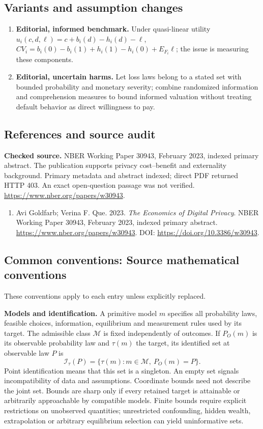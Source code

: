 \documentclass[11pt,a4paper]{article}
\begin{document}
\subsection*{Variants and assumption changes}
\begin{enumerate}
\item \textbf{Editorial, informed benchmark.} Under quasi-linear utility \(u_i(c,d,\ell)=c+b_i(d)-h_i(d)-\ell\), \(CV_i=b_i(0)-b_i(1)+h_i(1)-h_i(0)+E_{F_i}\ell\); the issue is measuring these components.
\item \textbf{Editorial, uncertain harms.} Let loss laws belong to a stated set with bounded probability and monetary severity; combine randomized information and comprehension measures to bound informed valuation without treating default behavior as direct willingness to pay.
\end{enumerate}
\subsection*{References and source audit}
\textbf{Checked source.} NBER Working Paper 30943, February 2023, indexed primary abstract. The publication supports privacy cost--benefit and externality background. Primary metadata and abstract indexed; direct PDF returned HTTP 403. An exact open-question passage was not verified. \url{https://www.nber.org/papers/w30943}.
\begin{enumerate}\raggedright
\item\hypertarget{definitions:source:30007688:1}{} Avi Goldfarb; Verina F. Que. 2023. \emph{The Economics of Digital Privacy}. NBER Working Paper 30943, February 2023, indexed primary abstract.
\url{https://www.nber.org/papers/w30943}.
DOI: \url{https://doi.org/10.3386/w30943}.
\end{enumerate}

\subsection*{Common conventions: Source mathematical conventions}

These conventions apply to each entry unless explicitly replaced.

\textbf{Models and identification.} A primitive model \(m\) specifies all probability laws, feasible choices, information, equilibrium and measurement rules used by its target. The admissible class \(\mathcal M\) is fixed independently of outcomes. If \(P_O(m)\) is its observable probability law and \(\tau(m)\) the target, its identified set at observable law \(P\) is
\[
 \mathcal I_\tau(P)=\{\tau(m):m\in\mathcal M,\ P_O(m)=P\}.
\]
Point identification means that this set is a singleton. An empty set signals incompatibility of data and assumptions. Coordinate bounds need not describe the joint set. Bounds are sharp only if every retained target is attainable or arbitrarily approachable by compatible models. Finite bounds require explicit restrictions on unobserved quantities; unrestricted confounding, hidden wealth, extrapolation or arbitrary equilibrium selection can yield uninformative sets.
\end{document}
